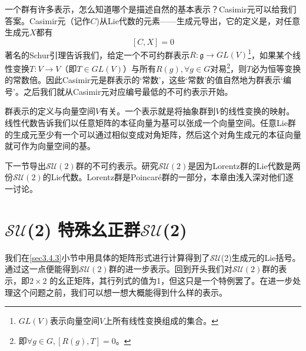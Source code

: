 一个群有许多表示，怎么知道哪个是描述自然的基本表示？Casimir元可以给我们答案。Casimir元（记作$C$)从Lie代数的元素——生成元导出，它的定义是，对任意生成元$X$都有
\begin{equation}
\label{equ3.93}
[C, X] = 0
\end{equation}
著名的Schur引理告诉我们，给定一个不可约群表示$R: \mathfrak{g} \rightarrow GL(V)$\footnote{$GL(V)$表示向量空间$V$上所有线性变换组成的集合。}，如果某个线性变换$T: V \rightarrow V$（即$T \in GL(V)$）与所有$R(g), \forall g \in G$对易\footnote{即$\forall g \in G, [R(g), T] = 0$。}，则$T$必为恒等变换的常数倍。因此Casimir元是群表示的‘常数’，这些‘常数’的值自然地为群表示‘编号’。之后我们就从Casimir元对应编号最低的不可约表示开始。

群表示的定义与向量空间$V$有关。一个表示就是将抽象群到$V$的线性变换的映射。线性代数告诉我们以任意矩阵的本征向量为基可以张成一个向量空间。任意Lie群的生成元至少有一个可以通过相似变成对角矩阵，然后这个对角生成元的本征向量就可作为向量空间的基。

下一节导出$\mathcal{SU}(2)$群的不可约表示。研究$\mathcal{SU}(2)$是因为Lorentz群的Lie代数是两份$\mathcal{SU}(2)$的Lie代数。Lorentz群是Poincar\'e群的一部分，本章由浅入深对他们逐一讨论。




\section[$\mathcal{SU}$(2)]{$\mathcal{SU}$(2)  特殊幺正群$\mathcal{SU}$(2)}\label{sec3.6}

我们在\ref{sec3.4.3}小节中用具体的矩阵形式进行计算得到了$\mathcal{SU}$(2)生成元的Lie括号。通过这一点便能得到$\mathcal{SU}(2)$群的进一步表示。回到开头我们对$\mathcal{SU}(2)$群的表示，即$2\times 2$ 的幺正矩阵，其行列式的值为1，但这只是一个特例罢了。在进一步处理这个问题之前，我们可以想一想大概能得到什么样的表示。

